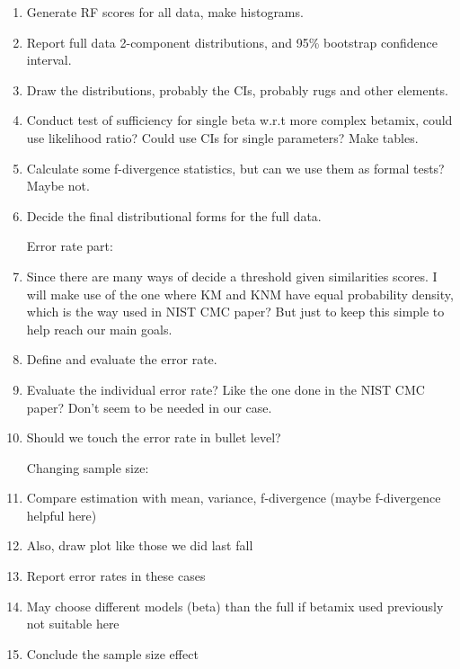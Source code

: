 \documentclass[12pt]{article}         %
\begin{document}
\begin{enumerate}
  \item Generate RF scores for all data, make histograms.
  \item Report full data 2-component distributions, and 95\% bootstrap confidence interval.
  \item Draw the distributions, probably the CIs, probably rugs and other elements.
  \item Conduct test of sufficiency for single beta w.r.t more complex betamix, could use likelihood ratio? Could use CIs for single parameters? Make tables.
  \item Calculate some f-divergence statistics, but can we use them as formal tests? Maybe not.
  \item Decide the final distributional forms for the full data.
  
  \bigskip
  
  Error rate part:
  
  \item Since there are many ways of decide a threshold given similarities scores. I will make use of the one where KM and KNM have equal probability density, which is the way used in NIST CMC paper? But just to keep this simple to help reach our main goals.
  \item Define and evaluate the error rate.
  \item Evaluate the individual error rate? Like the one done in the NIST CMC paper? Don’t seem to be needed in our case.
  \item Should we touch the error rate in bullet level?
  
  \bigskip
  
  Changing sample size:
  
  \item Compare estimation with mean, variance, f-divergence (maybe f-divergence helpful here)
  \item Also, draw plot like those we did last fall
  \item Report error rates in these cases
  \item May choose different models (beta) than the full if betamix used previously not suitable here
  \item Conclude the sample size effect
  
\end{enumerate}
\end{document}
